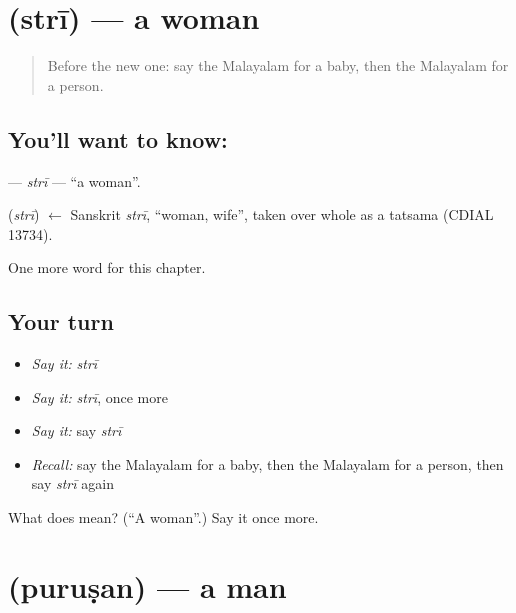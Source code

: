 \section[\texorpdfstring{\ml{സ്ത്രീ} (strī)}{സ്ത്രീ (strī)}]{ (strī) — a woman}

\label{lesson:ML-C325-stri}



\begin{quote}
Before the new one: say the Malayalam for a baby, then the Malayalam for a person.
\end{quote}

\subsection*{You'll want to know: }
\textbf{} — \emph{strī} — \textquotedblleft{}a woman\textquotedblright{}.

\begin{cousinweb}
\textbf{} (\emph{strī}) $\leftarrow$ Sanskrit \emph{strī}, \textquotedblleft{}woman, wife\textquotedblright{}, taken over whole as a tatsama (CDIAL 13734).
\end{cousinweb}

\begin{grammarlens}[title={What you've built}]
One more word for this chapter.
\end{grammarlens}

\subsection*{Your turn}
\begin{itemize}
\raggedright
  \item \emph{Say it:} \emph{strī}
  \item \emph{Say it:} \emph{strī}, once more
  \item \emph{Say it:} say \emph{strī}
  \item \emph{Recall:} say the Malayalam for a baby, then the Malayalam for a person, then say \emph{strī} again
\end{itemize}

\begin{tcolorbox}[breakable,colback=teal!4,colframe=teal!35!black,title={Before you move on}]
What does  mean? (\textquotedblleft{}A woman\textquotedblright{}.) Say it once more.
\end{tcolorbox}
\section[\texorpdfstring{\ml{പുരുഷൻ} (puruṣan)}{പുരുഷൻ (puruṣan)}]{ (puruṣan) — a man}

